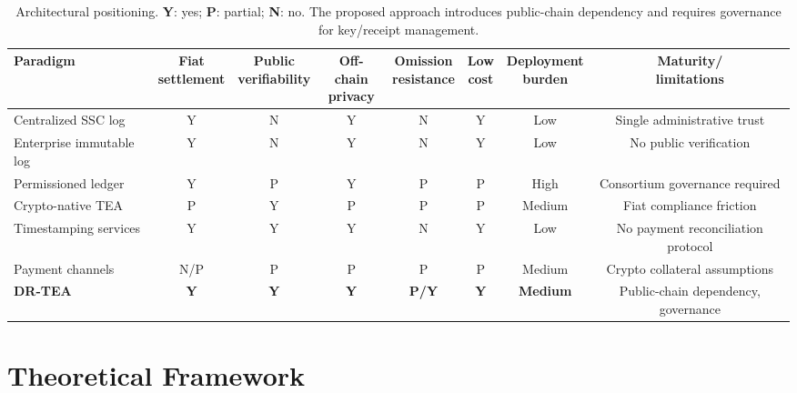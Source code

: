 \documentclass[journal]{IEEEtran}
\begin{document}
\begin{table}[!t]
\centering
\caption{Architectural positioning. \textbf{Y}: yes; \textbf{P}: partial; \textbf{N}: no. The proposed approach introduces public-chain dependency and requires governance for key/receipt management.}
\label{tab:positioning}
\renewcommand{\arraystretch}{1.15}
\small
\begin{tabular}{@{}l c c c c c c c@{}}
\toprule
\textbf{Paradigm} &
\makecell{\textbf{Fiat}\\\textbf{settlement}} &
\makecell{\textbf{Public}\\\textbf{verifiability}} &
\makecell{\textbf{Off-chain}\\\textbf{privacy}} &
\makecell{\textbf{Omission}\\\textbf{resistance}} &
\makecell{\textbf{Low}\\\textbf{cost}} &
\makecell{\textbf{Deployment}\\\textbf{burden}} &
\makecell{\textbf{Maturity/}\\\textbf{limitations}} \\
\midrule
Centralized SSC log       & Y & N & Y & N & Y & Low & Single administrative trust \\
Enterprise immutable log  & Y & N & Y & N & Y & Low & No public verification \\
Permissioned ledger       & Y & P & Y & P & P & High & Consortium governance required \\
Crypto-native TEA         & P & Y & P & P & P & Medium & Fiat compliance friction \\
Timestamping services     & Y & Y & Y & N & Y & Low & No payment reconciliation protocol \\
Payment channels          & N/P & P & P & P & P & Medium & Crypto collateral assumptions \\
\textbf{DR-TEA}           & \textbf{Y} & \textbf{Y} & \textbf{Y} & \textbf{P/Y} & \textbf{Y} & \textbf{Medium} & Public-chain dependency, governance \\
\bottomrule
\end{tabular}
\end{table}

\section{Theoretical Framework}
\label{sec:theory}
\end{document}
